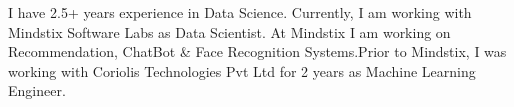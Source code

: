 
\begin{cvparagraph}
I have 2.5+ years experience in Data Science. Currently, I am working with Mindstix Software Labs as Data Scientist. At Mindstix I am working on Recommendation, ChatBot \& Face Recognition Systems.\newline Prior to Mindstix, I was working with Coriolis Technologies Pvt Ltd for 2 years as Machine Learning Engineer.
\end{cvparagraph}
